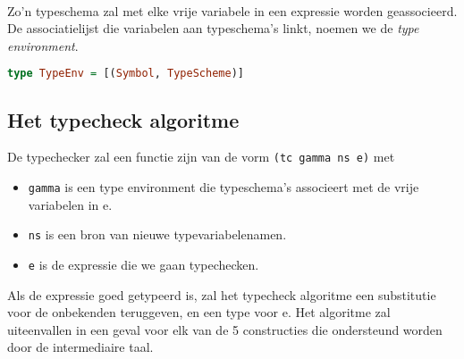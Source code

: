\documentclass[a4paper,10pt]{article}
\begin{document}
\paragraph{}
Zo'n typeschema zal met elke vrije variabele in een expressie worden geassocieerd. De associatielijst die variabelen aan typeschema's linkt, noemen we de \emph{type environment}.
\begin{lstlisting}[language=Haskell,frame=single]
type TypeEnv = [(Symbol, TypeScheme)]
\end{lstlisting}

\subsection{Het typecheck algoritme}
De typechecker zal een functie zijn van de vorm \texttt{(tc gamma ns e)} met
\begin{itemize}
  \item \texttt{gamma} is een type environment die typeschema's associeert met de vrije variabelen in e.
  \item \texttt{ns} is een bron van nieuwe typevariabelenamen.
  \item \texttt{e} is de expressie die we gaan typechecken.
\end{itemize}
Als de expressie goed getypeerd is, zal het typecheck algoritme een substitutie voor de onbekenden teruggeven, en een type voor e.
Het algoritme zal uiteenvallen in een geval voor elk van de 5 constructies die ondersteund worden door de intermediaire taal.
\end{document}

